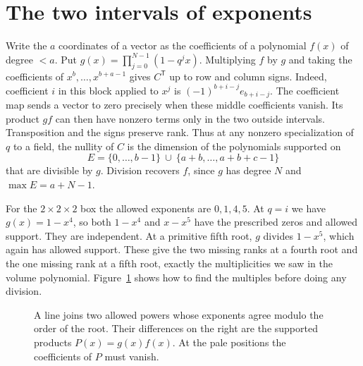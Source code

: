 \documentclass[11pt]{article}
\begin{document}
\section{The two intervals of exponents}

Write the \(a\) coordinates of a vector as the coefficients of a
polynomial \(f(x)\) of degree \(<a\). Put
\(g(x)=\prod_{j=0}^{N-1}(1-q^j x)\). Multiplying \(f\) by \(g\)
and taking the coefficients of
\(x^b,\ldots,x^{b+a-1}\) gives \(C^{\mathsf T}\) up to row and column
signs. Indeed, coefficient \(i\) in this block applied to \(x^j\) is
\((-1)^{b+i-j}e_{b+i-j}\). The coefficient map sends a vector to zero
precisely when these middle coefficients vanish. Its product \(gf\)
can then have nonzero terms only in the two outside intervals.
Transposition and the signs preserve rank. Thus at any nonzero
specialization of \(q\) to a field, the nullity of \(C\) is the
dimension of the polynomials supported on
\begin{equation}\label{eq:E}
 E=\{0,\ldots,b-1\}\ \cup\ \{a+b,\ldots,a+b+c-1\}
\end{equation}
that are divisible by \(g\). Division recovers \(f\), since \(g\) has
degree \(N\) and \(\max E=a+N-1\).

For the \(2\times2\times2\) box the allowed exponents are \(0,1,4,5\).
At \(q=i\) we have \(g(x)=1-x^4\), so both \(1-x^4\) and \(x-x^5\)
have the prescribed zeros and allowed support. They are independent.
At a primitive fifth root, \(g\) divides \(1-x^5\), which again has
allowed support. These give the two missing ranks at a fourth root and
the one missing rank at a fifth root, exactly the multiplicities we saw
in the volume polynomial. Figure~\ref{fig:degrees} shows how to find
the multiples before doing any division.

\begin{figure}[htbp]
\centering\ResiduePairs
\caption{A line joins two allowed powers whose exponents agree modulo
the order of the root. Their differences on the right are the supported
products \(P(x)=g(x)f(x)\). At the pale positions the coefficients
of \(P\) must vanish.}
\label{fig:degrees}
\end{figure}
\end{document}
